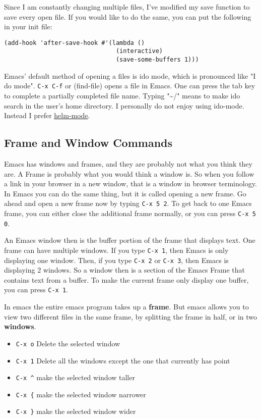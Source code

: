 \documentclass[11pt]{article}
\begin{document}
Since I am constantly changing multiple files, I've modified my save function to save every open file.  If you would like to do the same, you can put the following in your init file:

\begin{verbatim}
(add-hook 'after-save-hook #'(lambda ()
                               (interactive)
                               (save-some-buffers 1)))
\end{verbatim}

Emacs' default method of opening a files is ido mode, which is pronounced like "I do mode".  \texttt{C-x C-f} or (find-file) opens a file in Emacs.  One can press the tab key to complete a partially completed file name.  Typing "\textasciitilde{}/" means to make ido search in the user's home directory.  I personally do not enjoy using ido-mode. Instead I prefer \hyperref[sec:orgheadline6]{helm-mode}.
\subsection{Frame and Window Commands}
\label{sec:orgheadline2}
Emacs has windows and frames, and they are probably not what you think they are.  A Frame is probably what you would think a window is.  So when you follow a link in your browser in a new window, that is a window in browser terminology.  In Emacs you can do the same thing, but it is called opening a new frame.  Go ahead and open a new frame now by typing \texttt{C-x 5 2}.  To get back to one Emacs frame, you can either close the additional frame normally, or you can press \texttt{C-x 5 0}.

An Emacs window then is the buffer portion of the frame that displays text.  One frame can have multiple windows.  If you type \texttt{C-x 1}, then Emacs is only displaying one window.  Then, if you type \texttt{C-x 2} or \texttt{C-x 3}, then Emacs is displaying 2 windows.  So a window then is a section of the Emacs Frame that contains text from a buffer.  To make the current frame only display one buffer, you can press \texttt{C-x 1}.

In emacs the entire emacs program takes up a \textbf{frame}.  But emacs allows you to view two different files in the same frame, by splitting the frame in half, or in two \textbf{windows}.
\begin{itemize}
\item \texttt{C-x o} Delete the selected window
\item \texttt{C-x 1} Delete all the windows except the one that currently has point
\item \texttt{C-x \textasciicircum{}} make the selected window taller
\item \texttt{C-x \{} make the selected window narrower
\item \texttt{C-x \}} make the selected window wider
\end{itemize}
\end{document}
